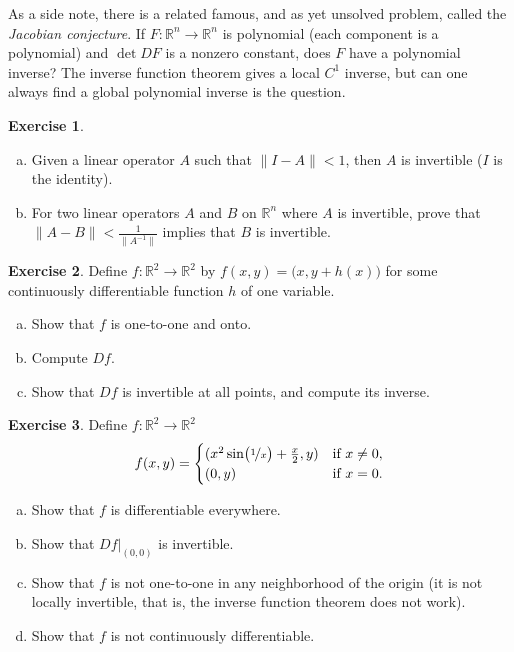 \documentclass[12pt,openany]{book}
\newcommand{\snorm}[1]{\lVert {#1} \rVert}
\newcommand{\R}{{\mathbb{R}}}
\newcommand{\myindex}[1]{#1\index{#1}}
\theoremstyle{plain}
\theoremstyle{remark}
\theoremstyle{definition}
\newenvironment{exbox}{%
    \def\FrameCommand{\vrule width 1pt \relax\hspace{10pt}}%
    \MakeFramed{\advance\hsize-\width\FrameRestore}%
}{%
    \endMakeFramed
}
\newenvironment{exparts}{%
    \leavevmode\begin{enumerate}[a),noitemsep,topsep=0pt,parsep=0pt,partopsep=0pt]
}{%
    \end{enumerate}
}
\theoremstyle{exercise}
\newtheorem{exercise}{Exercise}[section]
\theoremstyle{example}
\begin{document}
\medskip

As a side note, there is a related famous, and as yet unsolved problem,
called the \emph{\myindex{Jacobian conjecture}}.  If $F \colon \R^n \to
\R^n$ is polynomial (each component is a polynomial) and $\det DF$ is a nonzero
constant, does $F$ have a polynomial inverse?
The inverse function theorem gives a local $C^1$ inverse, but can one always
find a global polynomial inverse is the question.

\begin{exbox}
\begin{exercise}
\begin{exparts}
\item
Given a linear operator $A$ such that
$\snorm{I-A} < 1$, then $A$ is invertible ($I$ is the identity).
\item
For two linear operators $A$ and $B$ on $\R^n$ where $A$ is invertible,
prove that $\snorm{A-B} < \frac{1}{\snorm{A^{-1}}}$ implies that $B$ is
invertible.
\end{exparts}
\end{exercise}

\begin{exercise}
Define $f \colon \R^2 \to \R^2$ by $f(x,y) =
\bigl(x,y+h(x)\bigr)$ for some continuously differentiable function $h$ of one
variable.
\begin{exparts}
\item
Show that $f$ is one-to-one and onto.
\item
Compute $Df$.
\item
Show that $Df$ is invertible at all points, and compute
its inverse.
\end{exparts}
\end{exercise}

\begin{exercise}
Define $f \colon \R^2 \to \R^2$
\begin{equation*}
f(x,y) =
\begin{cases}
(x^2 \sin \bigl(\nicefrac{1}{x}\bigr) + \frac{x}{2} , y ) & \text{if } x \not= 0, \\
(0,y)                                                     & \text{if } x=0.
\end{cases}
\end{equation*}
\begin{exparts}
\item
Show that $f$ is differentiable everywhere.
\item
Show that $Df|_{(0,0)}$ is invertible.
\item
Show that $f$ is not one-to-one in any neighborhood of the origin (it is
not locally invertible, that is, the inverse function theorem does not work).
\item
Show that $f$ is not continuously differentiable.
\end{exparts}
\end{exercise}


\end{exbox}
\end{document}
